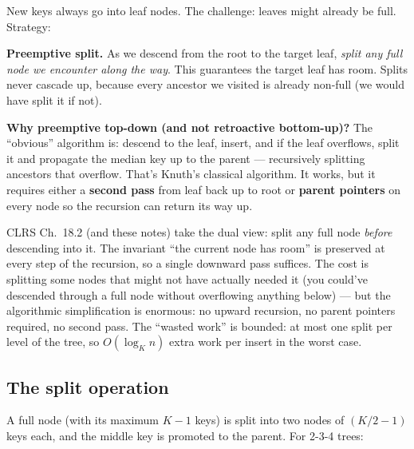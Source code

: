 \documentclass[11pt]{article}
\begin{document}
New keys always go into leaf nodes. The challenge: leaves might already be full. Strategy:

\begin{ideabox}
\textbf{Preemptive split.} As we descend from the root to the target leaf, \emph{split any full node we encounter along the way}. This guarantees the target leaf has room. Splits never cascade up, because every ancestor we visited is already non-full (we would have split it if not).
\end{ideabox}

\begin{notebox}
\textbf{Why preemptive top-down (and not retroactive bottom-up)?} The
``obvious'' algorithm is: descend to the leaf, insert, and if the
leaf overflows, split it and propagate the median key up to the
parent --- recursively splitting ancestors that overflow. That's
Knuth's classical algorithm. It works, but it requires either a
\textbf{second pass} from leaf back up to root or \textbf{parent
pointers} on every node so the recursion can return its way up.

CLRS Ch.~18.2 (and these notes) take the dual view: split any full
node \emph{before} descending into it. The invariant ``the current
node has room'' is preserved at every step of the recursion, so a
single downward pass suffices. The cost is splitting some nodes that
might not have actually needed it (you could've descended through a
full node without overflowing anything below) --- but the algorithmic
simplification is enormous: no upward recursion, no parent pointers
required, no second pass. The ``wasted work'' is bounded: at most
one split per level of the tree, so $O(\log_K n)$ extra work per
insert in the worst case.
\end{notebox}

\subsection*{The split operation}

A full node (with its maximum $K-1$ keys) is split into two nodes of $(K/2 - 1)$ keys each, and the middle key is promoted to the parent. For 2-3-4 trees:

\begin{center}
\end{center}
\end{document}
